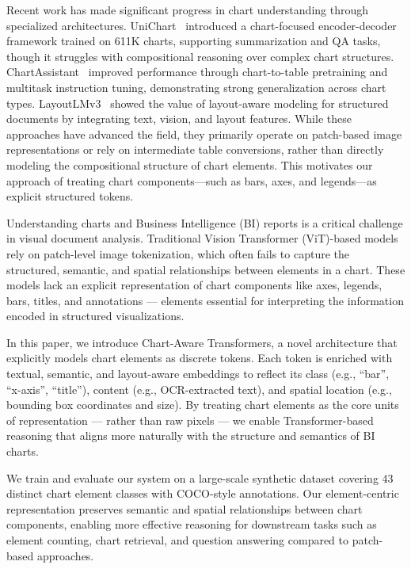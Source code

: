 \documentclass[11pt]{article}
\begin{document}
Recent work has made significant progress in chart understanding through specialized architectures. UniChart~\cite{masry2023unichart} introduced a chart-focused encoder-decoder framework trained on 611K charts, supporting summarization and QA tasks, though it struggles with compositional reasoning over complex chart structures. ChartAssistant~\cite{zhang2024chartassistant} improved performance through chart-to-table pretraining and multitask instruction tuning, demonstrating strong generalization across chart types. LayoutLMv3~\cite{huang2023layoutlmv3} showed the value of layout-aware modeling for structured documents by integrating text, vision, and layout features. While these approaches have advanced the field, they primarily operate on patch-based image representations or rely on intermediate table conversions, rather than directly modeling the compositional structure of chart elements. This motivates our approach of treating chart components—such as bars, axes, and legends—as explicit structured tokens.

Understanding charts and Business Intelligence (BI) reports is a critical challenge in visual document analysis. Traditional Vision Transformer (ViT)-based models rely on patch-level image tokenization, which often fails to capture the structured, semantic, and spatial relationships between elements in a chart. These models lack an explicit representation of chart components like axes, legends, bars, titles, and annotations — elements essential for interpreting the information encoded in structured visualizations.

In this paper, we introduce Chart-Aware Transformers, a novel architecture that explicitly models chart elements as discrete tokens. Each token is enriched with textual, semantic, and layout-aware embeddings to reflect its class (e.g., “bar”, “x-axis”, “title”), content (e.g., OCR-extracted text), and spatial location (e.g., bounding box coordinates and size). By treating chart elements as the core units of representation — rather than raw pixels — we enable Transformer-based reasoning that aligns more naturally with the structure and semantics of BI charts.

We train and evaluate our system on a large-scale synthetic dataset covering 43 distinct chart element classes with COCO-style annotations. Our element-centric representation preserves semantic and spatial relationships between chart components, enabling more effective reasoning for downstream tasks such as element counting, chart retrieval, and question answering compared to patch-based approaches.
\end{document}
